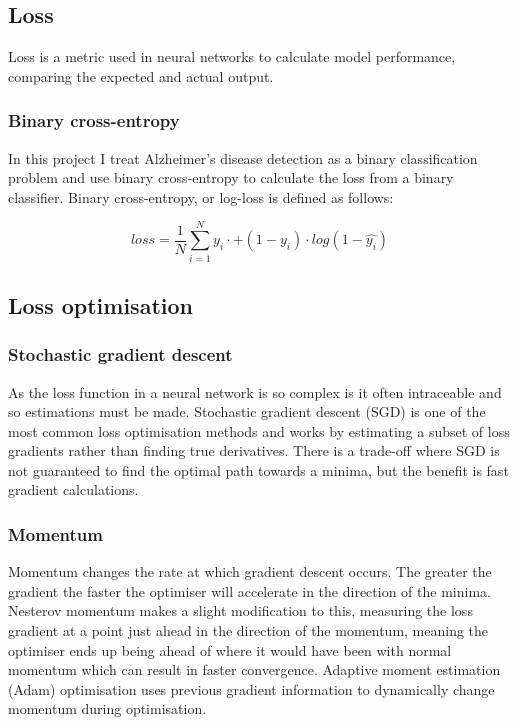 \documentclass[
    author={Kai Hulme},
    supervisor={Dr Jon Bird},
    degree={BSc},
    title={Generative Adversarial Networks as an Augmentation Technique},
    subtitle={for Alzheimer's Disease Detection in MRI Volumes},
    type={Research},
    year={2021} 
]{dissertation}
\begin{document}
\subsection{Loss}

Loss is a metric used in neural networks to calculate model performance, comparing the expected and actual output.

\subsubsection{Binary cross-entropy}

In this project I treat Alzheimer's disease detection as a binary classification problem and use binary cross-entropy to calculate the loss from a binary classifier. Binary cross-entropy, or log-loss is defined as follows:

\[ loss = \frac{1}{N} \sum_{i=1}^{N} y_i \cdot + (1-y_i) \cdot log(1 - \hat{y_i}) \]
	
\subsection{Loss optimisation}

\subsubsection{Stochastic gradient descent}

As the loss function in a neural network is so complex is it often intraceable and so estimations must be made. Stochastic gradient descent (SGD) is one of the most common loss optimisation methods and works by estimating a subset of loss gradients rather than finding true derivatives. There is a trade-off where SGD is not guaranteed to find the optimal path towards a minima, but the benefit is fast gradient calculations.

\subsubsection{Momentum}

Momentum changes the rate at which gradient descent occurs. The greater the gradient the faster the optimiser will accelerate in the direction of the minima. Nesterov momentum makes a slight modification to this, measuring the loss gradient at a point just ahead in the direction of the momentum, meaning the optimiser ends up being ahead of where it would have been with normal momentum which can result in faster convergence. Adaptive moment estimation (Adam) optimisation uses previous gradient information to dynamically change momentum during optimisation.
	
\end{document}
